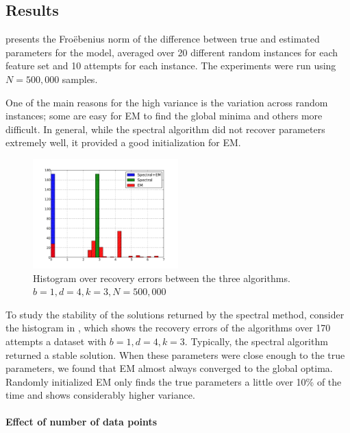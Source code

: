
\subsection{Results}

 presents the Fro\"ebenius norm of the
difference between true and estimated parameters for the model, averaged
over 20 different random instances for each feature set and 10 attempts
for each instance. The experiments were run using $N = 500,000$ samples.

One of the main reasons for the high variance is the variation across
random instances; some are easy for EM to find the global minima and
others more difficult. In general, while the spectral algorithm did not
recover parameters extremely well, it provided a good initialization for
EM.

\begin{figure}[tb]
  \centering
  \includegraphics[width=0.50\textwidth]{figures/hist.pdf}
  \caption{Histogram over recovery errors between the three algorithms. $b = 1, d = 4, k = 3, N = 500,000$}
  \label{fig:hist}
\end{figure}

To study the stability of the solutions returned by the spectral method,
consider the histogram in , which shows the recovery
errors of the algorithms over 170 attempts a dataset with $b = 1, d = 4,
k = 3$. Typically, the spectral algorithm returned a stable solution.
When these parameters were close enough to the true parameters, we found
that EM almost always converged to the global optima. Randomly
initialized EM only finds the true parameters a little over 10\% of the
time and shows considerably higher variance. 

\paragraph{Effect of number of data points}

